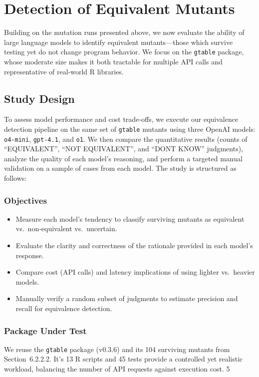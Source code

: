 
\section{Detection of Equivalent Mutants}

Building on the mutation runs presented above, we now evaluate the ability of large language models to identify equivalent mutants—those which survive testing yet do not change program behavior.  We focus on the \texttt{gtable} package, whose moderate size makes it both tractable for multiple API calls and representative of real‐world R libraries.

\subsection{Study Design}

To assess model performance and cost trade‐offs, we execute our equivalence detection pipeline on the same set of \texttt{gtable} mutants using three OpenAI models: \texttt{o4-mini}, \texttt{gpt-4.1}, and \texttt{o1}.  We then compare the quantitative results (counts of “EQUIVALENT”, “NOT EQUIVALENT”, and “DONT KNOW” judgments), analyze the quality of each model’s reasoning, and perform a targeted manual validation on a sample of cases from each model.  The study is structured as follows:

\subsubsection{Objectives}
\begin{itemize}
  \item Measure each model’s tendency to classify surviving mutants as equivalent vs.\ non‐equivalent vs.\ uncertain.
  \item Evaluate the clarity and correctness of the rationale provided in each model’s response.
  \item Compare cost (API calls) and latency implications of using lighter vs.\ heavier models.
  \item Manually verify a random subset of judgments to estimate precision and recall for equivalence detection.
\end{itemize}

\subsubsection{Package Under Test}
We reuse the \texttt{gtable} package (v0.3.6) and its 104 surviving mutants from Section~6.2.2.2.  It's 13 R scripts and 45 tests provide a controlled yet realistic workload, balancing the number of API requests against execution cost.
5
